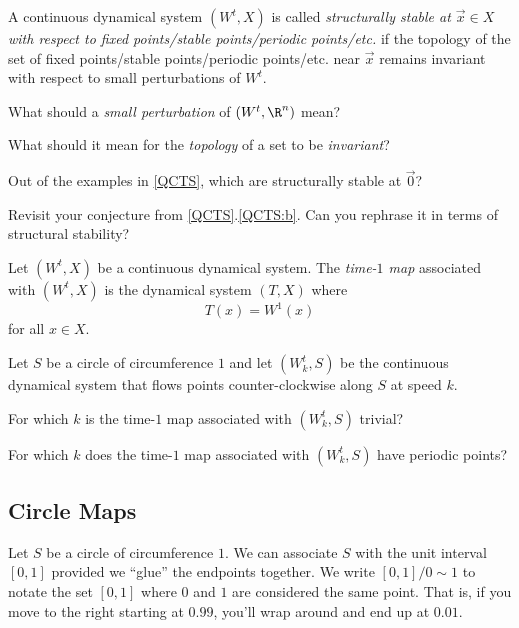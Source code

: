 		
	\begin{definition}
		A continuous dynamical system $(W^t,X)$ is called \emph{structurally stable at $\vec x\in X$
		with respect to fixed points/stable points/periodic points/etc.} if the topology of
		the set of fixed points/stable points/periodic points/etc. near $\vec x$ remains invariant with respect
		to small perturbations of $W^t$.
	\end{definition}

	\question
	\begin{parts}
		\item What should a \emph{small perturbation} of $(W^t,\R^n)$ mean?
		\item What should it mean for the \emph{topology} of a set to be \emph{invariant}?
		\item Out of the examples in \ref{QCTS}, which are structurally stable at $\vec 0$?
		\item Revisit your conjecture from \ref{QCTS}.\ref{QCTS:b}. Can you rephrase it in terms of structural
			stability?
	\end{parts}

	\newpage
	\begin{definition}
		Let $(W^t,X)$ be a continuous dynamical system. The \emph{time-$1$ map}
		associated with $(W^t,X)$ is the dynamical system $(T,X)$ where
		\[
			T(x) = W^1(x)
		\]
		for all $x\in X$.
	\end{definition}

	\question
	\label{QCIRCCONT}
	Let $S$ be a circle of circumference $1$ and let $(W^t_k,S)$ be the continuous dynamical
	system that flows points counter-clockwise along $S$ at speed $k$.
	\begin{parts}
		\item For which $k$ is the time-$1$ map associated with $(W^t_k,S)$ trivial?
		\item For which $k$ does the time-$1$ map associated with $(W^t_k,S)$ have periodic points?
	\end{parts}

	\newpage
	\subsection*{Circle Maps}
	Let $S$ be a circle of circumference $1$. We can associate $S$ with the unit interval $[0,1]$ provided
	we ``glue'' the endpoints together. We write $[0,1]/0\sim1$ to notate the set $[0,1]$ where $0$ and $1$
	are considered the same point. That is, if you move to the right starting at $0.99$, you'll wrap around
	and end up at $0.01$.

